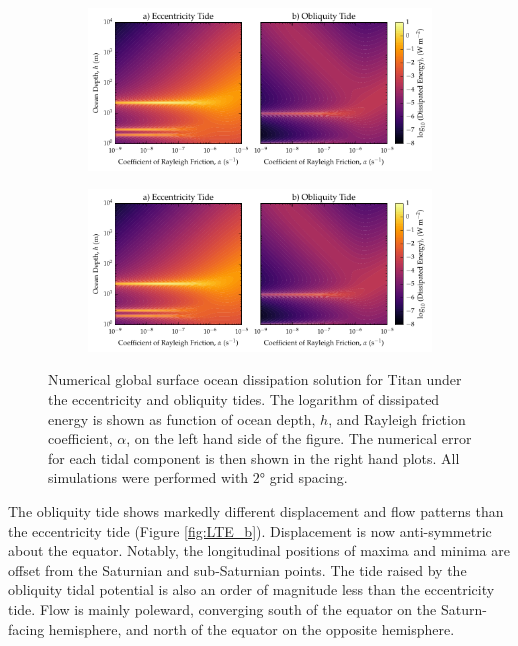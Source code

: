 \begin{figure}[!t]
    \centering
    \begin{subfigure}[t]{0.9\linewidth} %
        \includegraphics[width=\linewidth]{Figures/titan_linear}
        \label{fig:lincEccTitan}
    \end{subfigure}
    \begin{subfigure}[t]{0\linewidth} %
         \includegraphics[width=\linewidth]{Figures/titan_linear}
         \label{fig:linObliqTitan}   
    \end{subfigure}
    \vspace{-0.5cm}
\caption{Numerical global surface ocean dissipation solution for Titan under the eccentricity and obliquity tides. The logarithm of dissipated energy is shown as function of ocean depth, $h$, and Rayleigh friction coefficient, $\alpha$, on the left hand side of the figure. The numerical error for each tidal component is then shown in the right hand plots. All simulations were performed with $\ang{2}$ grid spacing.}
\label{fig:linTitan}
\end{figure}

The obliquity tide shows markedly different displacement and flow patterns than the eccentricity tide (Figure \ref{fig:LTE_b}). Displacement is now anti-symmetric about the equator. Notably, the longitudinal positions of maxima and minima are offset from the Saturnian and sub-Saturnian points. The tide raised by the obliquity tidal potential is also an order of magnitude less than the eccentricity tide. Flow is mainly poleward, converging south of the equator on the Saturn-facing hemisphere, and north of the equator on the opposite hemisphere.


